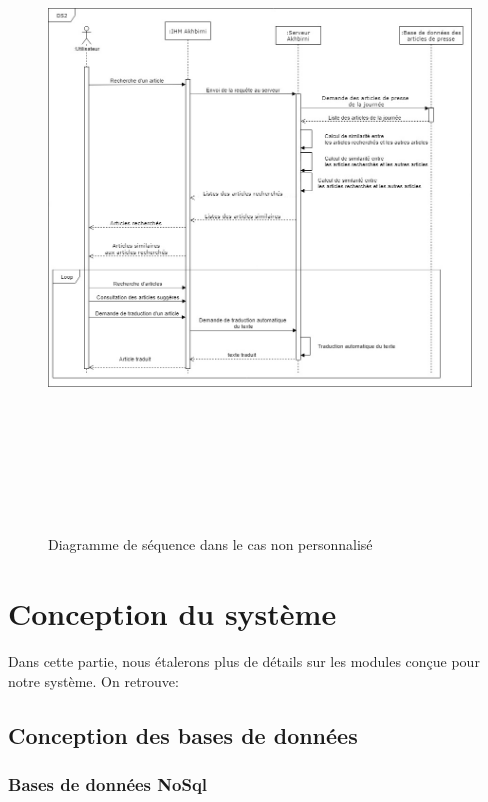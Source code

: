 \begin{figure}[H]
    \centering
    \includegraphics[height=500pt,width=450pt]{img/chapter3/diag_seq_nonpers.jpg}
    \caption{Diagramme de séquence dans le cas non personnalisé}
\end{figure}

\section{Conception du système}
Dans cette partie, nous étalerons plus de détails sur les modules conçue pour notre système.
On retrouve:

\subsection{Conception des bases de données}

\subsubsection{Bases de données NoSql}

